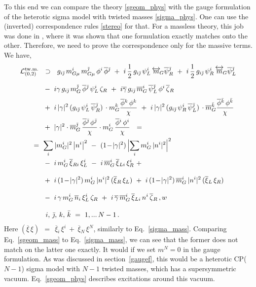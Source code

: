 \documentclass[12pt]{article}
\newcommand{\ov}{\overline}
\newcommand{\mc}[1]{\mathcal{#1}}
\newcommand{\bxir}{\ov{\xi}{}_R}
\newcommand{\bxil}{\ov{\xi}{}_L}
\newcommand{\xir}{\xi_R}
\newcommand{\xil}{\xi_L}
\newcommand{\bzr}{\ov{\zeta}{}_R}
\newcommand{\zr}{\zeta_R}
\newcommand{\bgamma}{\ov{\gamma}}
\newcommand{\bpsi}{\ov{\psi}{}}
\newcommand{\bphi}{\ov{\phi}{}}
\newcommand{\bxi}{\ov{\xi}{}}
\newcommand{\bj}{{\bar \jmath}}
\newcommand{\bk}{{\bar k}}
\begin{document}
	To this end we can compare the theory \eqref{sgeom_phys} with the gauge formulation of the heterotic sigma
	model with twisted masses \eqref{sigma_phys}.
	One can use the (inverted) correspondence rules \eqref{stereo} for that. 
	For a massless theory, this job was done in \cite{BSYhet}, where it was shown that one formulation exactly
	matches onto the other.
	Therefore, we need to prove the correspondence only for the massive terms.
	We have,
\begin{align}
%
\notag
	\mc{L}_{(0,2)}^\text{tw.m.} & ~~\supset~~ 
	g_{i\bj}\, m_{G\mu}^i\,m_{G\mu}^\bj\, \phi^i\, \bphi^\bj
	~+~ i\,\frac{1}{2}\,g_{i\bj}\,\psi_L^i\, \overleftrightarrow{m}{}_{\!G} \bpsi_R^\bj
	~+~ i\,\frac{1}{2}\,g_{i\bj}\,\psi_R^i\, \overleftrightarrow{\ov{m}}{}_{\!G} \bpsi_L^\bj
	\\[2mm]
%
\notag
	&~
	~-~ i\gamma\, g_{i\bj}\, m_G^\bj\,\bphi^\bj\, \psi_L^i\,\zr
	~+~ i\bgamma\, g_{i\bj}\,\ov{m}{}_G^i\, \bpsi_L^\bj\, \phi^i\,\bzr
	\\[1mm]
%
\notag
	&~
	~+~ i\, |\gamma|^2\, (g_{i\bj}\,\psi_L^i\,\bpsi_R^\bj)\, \cdot m_G^k \frac{\bphi^k\, \phi^k}{\chi}
	~+~ i\, |\gamma|^2\, (g_{i\bj}\,\psi_R^i\,\bpsi_L^\bj)\, \cdot \ov{m}{}_G^\bk \frac{\bphi^\bk\,\phi^\bk}{\chi}
	\\
%
\notag
	&~
	~+~ |\gamma|^2 \cdot \ov{m}{}_G^\bj\,\frac{\bphi^\bj\,\phi^\bj}{\chi}
			\cdot m_G^i\, \frac{\bphi^i\, \phi^i}{\chi}
	~~=~~
	\\
%
\label{sgeom_mass}
	&\!\!\!\!\!\!\!\!
	~=~
	\sum_i |m_G^i|^2 \left|n^i \right|^2 ~-~ (1 \!-\! |\gamma|^2)\, \Bigl| \sum_i m_G^i\, |n^i|^2 \Bigr|^2 
	\\
%
\notag
	&~
	~-~ i\,m_G^i\,\bxi_{Ri}\,\xi_L^i 
	~-~ i\,\ov{m}{}_G^i\, \bxi_{Li}\, \xi_R^i ~+~
	\\[3mm]
%
\notag
	&~
	~+~ i\,(1\!-\!|\gamma|^2)\, m_G^i\,|n^i|^2\, (\bxir\,\xil) 
	~+~ i\,(1\!-\!|\gamma|^2)\, \ov{m}{}_G^i\,|n^i|^2\, (\bxil\,\xir)
	\\[3mm]
%
\notag
	&~
	~-~ i\,\gamma\, m_G^i\,\ov{n}{}_i\, \xi_L^i\, \zr
	~+~ i\,\bgamma\, \ov{m}{}_G^i\, \bxi_{Li}\, n^i\, \bzr\,,
w	\\[3mm]
%
\notag
	&~~~
	\text{$i$, $\bj$, $k$, $\bk$} ~=~ 1,...\, N-1\,.
\end{align}
	Here 
$
	(\ov{\xi}\, \xi) ~~=~~ \ov{\xi}{}_i\, \xi^i  ~+~  \ov{\xi}{}_N\, \xi^N
$,
	similarly to Eq.~\eqref{sigma_mass}.
	Comparing Eq.~\eqref{sgeom_mass} to Eq.~\eqref{sigma_mass}, we can see that the former
	does not match on the latter one exactly.
	It would if we set $ m^N = 0 $ in the gauge formulation.
	As was discussed in section~\ref{gaugef}, this would be a heterotic CP($N-1$) sigma model
	with $ N-1 $ twisted masses, which has a supersymmetric vacuum.
	Eq.~\eqref{sgeom_phys} describes excitations around this vacuum.
\end{document}
